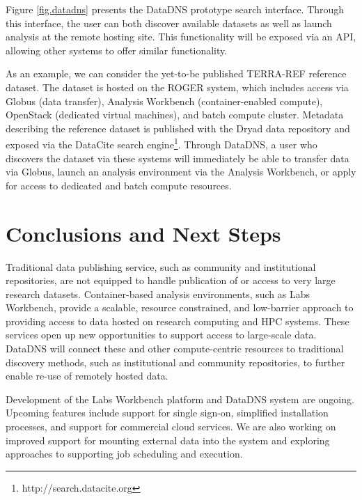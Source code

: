 \documentclass{sig-alternate}
\begin{document}
Figure \ref{fig.datadns} presents the DataDNS prototype search interface. Through this interface, the user can both discover available datasets as well as launch analysis at the remote hosting site. This functionality will be exposed via an API, allowing other systems to offer similar functionality.

As an example, we can consider the yet-to-be published TERRA-REF reference dataset. The dataset is hosted on the ROGER system, which includes access via Globus (data transfer), Analysis Workbench (container-enabled compute), OpenStack (dedicated virtual machines), and batch compute cluster.  Metadata describing the reference dataset is published with the Dryad data repository and exposed via the DataCite search engine\footnote{http://search.datacite.org}. Through DataDNS, a user who discovers the dataset via these systems will immediately be able to transfer data via Globus, launch an analysis environment via the Analysis Workbench, or apply for access to dedicated and batch compute resources.


\section{Conclusions and Next Steps}

Traditional data publishing service, such as community and institutional repositories, are not equipped to handle publication of or access to very large research datasets.  Container-based analysis environments, such as Labs Workbench, provide a scalable, resource constrained, and low-barrier approach to providing access to data hosted on research computing and HPC systems. These services open up  new opportunities to support access to large-scale data.  DataDNS will connect these and other compute-centric resources to traditional discovery methods, such as institutional and community repositories, to further enable re-use of remotely hosted data.


Development of the Labs Workbench platform and DataDNS system are ongoing.  Upcoming features include support for single sign-on, simplified installation processes, and support for commercial cloud services. We are also working on improved support for mounting external data into the system and exploring approaches to supporting job scheduling and execution.


\small
  
\end{document}
